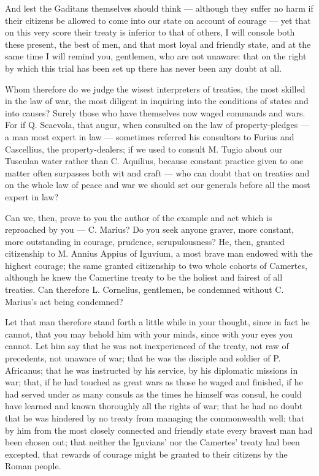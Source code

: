  And lest the Gaditans themselves should think --- although they suffer no harm if their citizens be allowed to come into our state on account of courage --- yet that on this very score their treaty is inferior to that of others, I will console both these present, the best of men, and that most loyal and friendly state, and at the same time I will remind you, gentlemen, who are not unaware: that on the right by which this trial has been set up there has never been any doubt at all.

 Whom therefore do we judge the wisest interpreters of treaties, the most skilled in the law of war, the most diligent in inquiring into the conditions of states and into causes? Surely those who have themselves now waged commands and wars. For if Q. Scaevola, that augur, when consulted on the law of property-pledges --- a man most expert in law --- sometimes referred his consultors to Furius and Cascellius, the property-dealers; if we used to consult M. Tugio about our Tusculan water rather than C. Aquilius, because constant practice given to one matter often surpasses both wit and craft --- who can doubt that on treaties and on the whole law of peace and war we should set our generals before all the most expert in law?

 Can we, then, prove to you the author of the example and act which is reproached by you --- C. Marius? Do you seek anyone graver, more constant, more outstanding in courage, prudence, scrupulousness? He, then, granted citizenship to M. Annius Appius of Iguvium, a most brave man endowed with the highest courage; the same granted citizenship to two whole cohorts of Camertes, although he knew the Camertine treaty to be the holiest and fairest of all treaties. Can therefore L. Cornelius, gentlemen, be condemned without C. Marius's act being condemned?

 Let that man therefore stand forth a little while in your thought, since in fact he cannot, that you may behold him with your minds, since with your eyes you cannot. Let him say that he was not inexperienced of the treaty, not raw of precedents, not unaware of war; that he was the disciple and soldier of P. Africanus; that he was instructed by his service, by his diplomatic missions in war; that, if he had touched as great wars as those he waged and finished, if he had served under as many consuls as the times he himself was consul, he could have learned and known thoroughly all the rights of war; that he had no doubt that he was hindered by no treaty from managing the commonwealth well; that by him from the most closely connected and friendly state every bravest man had been chosen out; that neither the Iguvians' nor the Camertes' treaty had been excepted, that rewards of courage might be granted to their citizens by the Roman people.


